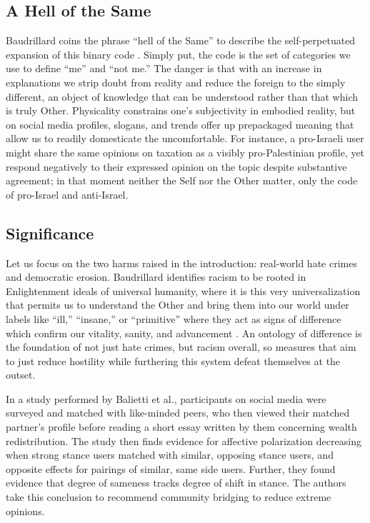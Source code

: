 \documentclass[11pt]{article}   %
\begin{document}
\subsection{A Hell of the Same}\label{sec:hell-of-the-same}
Baudrillard coins the phrase ``hell of the Same'' to describe the self-perpetuated expansion of this binary code \parencite{Baudrillard_1993}. Simply put, the code is the set of categories we use to
define ``me'' and ``not me.'' The danger is that with an increase in explanations we strip doubt from reality and reduce the foreign to the simply different, an object of
knowledge that can be understood rather than that which is truly Other. Physicality constrains one's subjectivity in embodied reality, but on social media profiles, slogans,
and trends offer up prepackaged meaning that allow us to readily domesticate the uncomfortable. For instance, a pro-Israeli user might share the same opinions on taxation
as a visibly pro-Palestinian profile, yet respond negatively to their expressed opinion on the topic despite substantive agreement; in that moment neither the Self nor the Other
matter, only the code of pro-Israel and anti-Israel.

\subsection{Significance}\label{sec:significance}
Let us focus on the two harms raised in the introduction:
real-world hate crimes and democratic erosion. Baudrillard identifies racism to be rooted in Enlightenment ideals of universal humanity, where it is this very universalization that permits us to
understand the Other and bring them into our world under labels like ``ill,'' ``insane,'' or ``primitive'' where they act as signs of difference which confirm our vitality, sanity, and advancement \parencite[pg. 129]{Baudrillard_1993}. An ontology
of difference is the foundation of not just hate crimes, but racism overall, so measures that aim to just reduce hostility while furthering this system defeat themselves at the outset. \bigskip

In a study performed by Balietti et al.\parencite*{Balietti2021}, participants on social media were surveyed and matched with like-minded peers, who then viewed their matched partner's profile before reading
a short essay written by them concerning wealth redistribution. The study then finds evidence for affective polarization decreasing when strong stance users matched with similar, opposing stance users, and
opposite effects for pairings of similar, same side users. Further, they found evidence that degree of sameness tracks degree of shift in stance. The authors take this conclusion to recommend community bridging
to reduce extreme opinions. \bigskip
\end{document}
